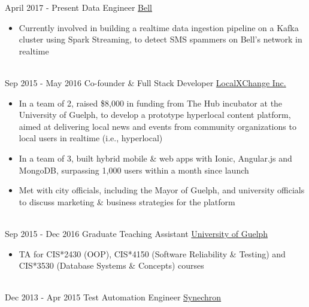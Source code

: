 \documentclass[letterpaper]{twentysecondcv} %
\begin{document}
\begin{twenty} %
\twentyitem
    	{April 2017 -}
		{Present}
        {Data Engineer}
        {\href{http://www.bell.ca/}{Bell}}
        {}
        {\begin{itemize}
        \item Currently involved in building a realtime data ingestion pipeline on a Kafka cluster using Spark Streaming, to detect SMS spammers on Bell's network in realtime
        \end{itemize}}
        \\
	\twentyitem
    	{Sep 2015 -}
		{May 2016}
        {Co-founder \& Full Stack Developer}
        {\href{http://www.localxchange.ca/}{LocalXChange Inc.}}
        {}
        {
        {\begin{itemize}
        \item In a team of 2, raised \$8,000 in funding from The Hub incubator at the University of Guelph, to develop a prototype hyperlocal content platform, aimed at delivering local news and events from community organizations to local users in realtime (i.e., hyperlocal)
        \item In a team of 3, built hybrid mobile \& web apps with Ionic, Angular.js and MongoDB, surpassing 1,000 users within a month since launch
        \item Met with city officials, including the Mayor of Guelph, and university officials to discuss marketing \& business strategies for the platform 
    \end{itemize}}
        }
    \\   
    \twentyitem
   		{Sep 2015 -}
		{Dec 2016}
        {Graduate Teaching Assistant}
        {\href{http://www.uoguelph.ca}{University of Guelph}}
        {}
        {
        {\begin{itemize}
        \item TA for CIS*2430 (OOP), CIS*4150 (Software Reliability \& Testing) and CIS*3530 (Database Systems \& Concepts) courses
    \end{itemize}}
        }
     \\
     \twentyitem
   		{Dec 2013 -}
		{Apr 2015}
        {Test Automation Engineer}
        {\href{http://www.synechron.com/}{Synechron}}
        {}
        {
        \begin{itemize}

\end{itemize}}
\end{twenty}
\end{document}
